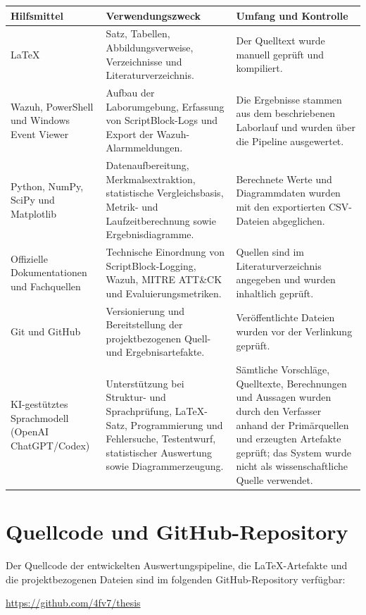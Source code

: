 \documentclass[12pt,a4paper,oneside,parskip=half]{scrreprt}
\renewcommand{\arraystretch}{1.25}
\begin{document}
\begingroup
\small
\renewcommand{\arraystretch}{1.10}
\begin{longtable}{|L{3.3cm}|L{4.8cm}|L{4.5cm}|}
\hline
\textbf{Hilfsmittel} & \textbf{Verwendungszweck} & \textbf{Umfang und Kontrolle}\\
\hline
LaTeX & Satz, Tabellen, Abbildungsverweise, Verzeichnisse und Literaturverzeichnis. & Der Quelltext wurde manuell geprüft und kompiliert.\\
\hline
Wazuh, PowerShell und Windows Event Viewer & Aufbau der Laborumgebung, Erfassung von ScriptBlock-Logs und Export der Wazuh-Alarmmeldungen. & Die Ergebnisse stammen aus dem beschriebenen Laborlauf und wurden über die Pipeline ausgewertet.\\
\hline
Python, NumPy, SciPy und Matplotlib & Datenaufbereitung, Merkmalsextraktion, statistische Vergleichsbasis, Metrik- und Laufzeitberechnung sowie Ergebnisdiagramme. & Berechnete Werte und Diagrammdaten wurden mit den exportierten CSV-Dateien abgeglichen.\\
\hline
Offizielle Dokumentationen und Fachquellen & Technische Einordnung von ScriptBlock-Logging, Wazuh, MITRE ATT\&CK und Evaluierungsmetriken. & Quellen sind im Literaturverzeichnis angegeben und wurden inhaltlich geprüft.\\
\hline
Git und GitHub & Versionierung und Bereitstellung der projektbezogenen Quell- und Ergebnisartefakte. & Veröffentlichte Dateien wurden vor der Verlinkung geprüft.\\
\hline
KI-gestütztes Sprachmodell (OpenAI ChatGPT/Codex) & Unterstützung bei Struktur- und Sprachprüfung, LaTeX-Satz, Programmierung und Fehlersuche, Testentwurf, statistischer Auswertung sowie Diagrammerzeugung. & Sämtliche Vorschläge, Quelltexte, Berechnungen und Aussagen wurden durch den Verfasser anhand der Primärquellen und erzeugten Artefakte geprüft; das System wurde nicht als wissenschaftliche Quelle verwendet.\\
\hline
\end{longtable}
\endgroup

\clearpage
\chapter*{Quellcode und GitHub-Repository}

Der Quellcode der entwickelten Auswertungspipeline, die LaTeX-Artefakte und die projektbezogenen Dateien sind im folgenden GitHub-Repository verfügbar:

\vspace{1cm}

\begin{center}
\large
\url{https://github.com/4fv7/thesis}
\end{center}
\end{document}

